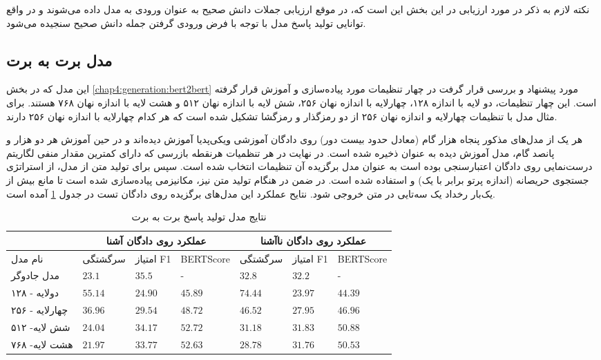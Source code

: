 نکته لازم به ذکر در مورد ارزیابی در این بخش این است که، در موقع ارزیابی جملات دانش صحیح به عنوان ورودی به مدل داده‌ می‌شوند و در واقع توانایی تولید پاسخ مدل با توجه با فرض ورودی گرفتن جمله دانش صحیح سنجیده می‌شود. 

\subsection{مدل برت به برت}
این مدل که در بخش 
\ref{chap4:generation:bert2bert}
مورد پیشنهاد و بررسی قرار گرفت در چهار تنظیمات مورد پیاده‌سازی و آموزش قرار گرفته است. این چهار تنظیمات، دو لایه با اندازه ۱۲۸، چهارلایه با اندازه نهان ۲۵۶، شش لایه با اندازه نهان ۵۱۲ و هشت لایه با اندازه نهان ۷۶۸ هستند. برای مثال مدل با تنظیمات چهارلایه و اندازه نهان ۲۵۶ از دو رمزگذار و رمزگشا تشکیل شده است که هر کدام چهارلایه با اندازه نهان ۲۵۶ دارند. 

هر یک از مدل‌های مذکور پنجاه هزار گام (معادل حدود بیست دور) روی دادگان آموزشی ویکی‌پدیا آموزش دیده‌اند و در حین آموزش هر دو هزار و پانصد گام، مدل آموزش دیده به عنوان 
ذخیره شده است. در نهایت  در هر تنظمیات  هرنقطه‌ بازرسی که دارای کمترین مقدار منفی لگاریتم درست‌نمایی روی دادگان اعتبارسنجی بوده است به عنوان مدل برگزیده آن تنظیمات انتخاب شده است. سپس برای تولید متن از مدل، از استراتژی
جستجوی حریصانه (اندازه پرتو برابر با یک)  و  
استفاده شده است.  در ضمن در هنگام تولید متن نیز، مکانیزمی پیاده‌سازی شده است تا مانع بیش از یک‌بار رخداد یک سه‌تایی در متن خروجی شود. 
نتایح عملکرد این مدل‌های برگزیده روی دادگان تست در جدول 
\ref{table:generation:bert2bert:beam1}
 آمده است.
\begin{table}[htb]
	\caption{ نتایج مدل تولید پاسخ برت به برت}
	\label{table:generation:bert2bert:beam1}
	\begin{tabular}{|l|l|l|l|l|l|l|}
		\hline
		& \multicolumn{3}{c|}{عملکرد روی دادگان آشنا} & \multicolumn{3}{c|}{عملکرد روی دادگان نا‌آشنا} \\ \hline
		نام مدل        & سرگشتگی     & امتیاز F1     & BERTScore     & سرگشتگی      & امتیاز F1      & BERTScore      \\ \hline
		مدل جادوگر     & $23.1$      & $35.5$        & -             & $32.8$       & $32.2$         & -              \\ \hline
		دولایه - ۱۲۸   & $55.14$     & $24.90$       & $45.89$       & $74.44$      & $23.97$        & $44.39$        \\ \hline
		چهارلایه - ۲۵۶ & $36.96$     & $29.54$       & $48.72$       & $46.52$      & $27.95$        & $46.96$        \\ \hline
		شش لایه- ۵۱۲   & $24.04$     & $34.17$       & $52.72$       & $31.18$      & $31.83$        & $50.88$        \\ \hline
		هشت لایه- ۷۶۸  & $21.97$     & $33.77$       & $52.63$       & $28.78$      & $31.76$        & $50.53$        \\ \hline
	\end{tabular}
\end{table}


